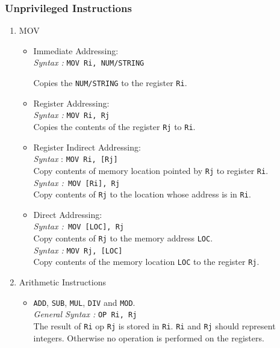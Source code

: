 \documentclass[11pt]{article}
\begin{document}
\subsubsection{Unprivileged Instructions}

\begin{enumerate}
\item MOV
\begin{itemize}
\item Immediate Addressing:\\
\textit{Syntax :} \texttt{MOV Ri, NUM/STRING}

Copies the \texttt{NUM/STRING} to the register \texttt{Ri}.

\item Register Addressing:\\
\textit{Syntax :} \texttt{MOV Ri, Rj}\\
Copies the contents of the register \texttt{Rj} to \texttt{Ri}.

\item Register Indirect Addressing:\\
\textit{Syntax }: \texttt{MOV Ri, [Rj]}\\
Copy contents of memory location pointed by \texttt{Rj} to register \texttt{Ri}.\\
\textit{Syntax :}\texttt{ MOV [Ri], Rj} \\
Copy contents of \texttt{Rj} to the location whose address is in \texttt{Ri}.
\item Direct Addressing:\\
\textit{Syntax :}\texttt{ MOV [LOC], Rj}\\
Copy contents of \texttt{Rj}  to the memory address \texttt{LOC}.\\
\textit{Syntax :} \texttt{MOV Rj, [LOC]}\\
Copy contents of the memory location \texttt{LOC} to the register \texttt{Rj}.
\end{itemize}


\item Arithmetic Instructions

\begin{itemize}
\item \texttt{ADD}, \texttt{SUB}, \texttt{MUL}, \texttt{DIV} and \texttt{MOD}.\\
\textit{General Syntax :} \texttt{OP Ri, Rj}\\
The result of \texttt{Ri} op \texttt{Rj} is stored in \texttt{Ri}. \texttt{Ri} and \texttt{Rj} should represent integers. Otherwise no operation is performed on the registers.


\end{itemize}
\end{enumerate}
\end{document}
